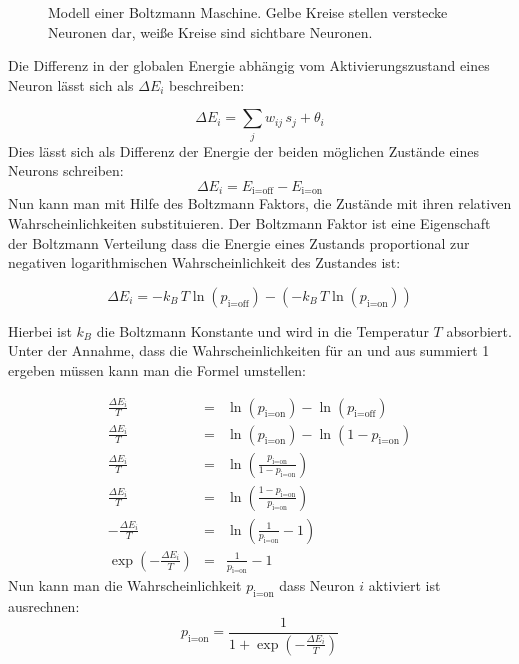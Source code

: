 \documentclass[12pt]{article}
\begin{document}
\begin{figure}[H]
	\center
	
	\caption{Modell einer Boltzmann Maschine. Gelbe Kreise stellen verstecke Neuronen dar, weiße Kreise sind sichtbare Neuronen.}
	\label{Boltzmannmaschine}
	\end{figure}
	
Die Differenz in der globalen Energie abhängig vom Aktivierungszustand eines Neuron lässt sich als  $\Delta E_i$ beschreiben:

\begin{equation}
\Delta E_i = \sum_j w_{ij} \, s_j + \theta_i
\end{equation}
 Dies lässt sich als Differenz der Energie der beiden möglichen Zustände eines Neurons schreiben:
 \begin{equation}
 \Delta E_i = E_\text{i=off} - E_\text{i=on}
 \end{equation}
 Nun kann man mit Hilfe des Boltzmann Faktors, die Zustände mit ihren relativen Wahrscheinlichkeiten substituieren. Der Boltzmann Faktor ist eine Eigenschaft der Boltzmann Verteilung dass die Energie eines Zustands proportional zur negativen logarithmischen Wahrscheinlichkeit des Zustandes ist:
 
 \begin{equation}
 \Delta E_i = -k_B\,T\ln(p_\text{i=off}) - (-k_B\,T\ln(p_\text{i=on}))
 \end{equation}
 
 Hierbei ist $k_B$ die Boltzmann Konstante und wird in die Temperatur $T$ absorbiert. Unter der Annahme, dass die Wahrscheinlichkeiten für an und aus summiert 1 ergeben müssen kann man die Formel umstellen:
 
 \begin{eqnarray}
 \frac{\Delta E_i}{T} &=& \ln(p_\text{i=on}) - \ln(p_\text{i=off})\\\nonumber
\frac{\Delta E_i}{T} &=& \ln(p_\text{i=on}) - \ln(1 - p_\text{i=on})\\\nonumber
\frac{\Delta E_i}{T} &=& \ln\left(\frac{p_\text{i=on}}{1 - p_\text{i=on}}\right)\\\nonumber
\frac{\Delta E_i}{T} &=& \ln\left(\frac{1 - p_\text{i=on}}{p_\text{i=on}}\right)\\\nonumber
-\frac{\Delta E_i}{T} &=& \ln\left(\frac{1}{p_\text{i=on}} - 1\right)\\\nonumber
\exp\left(-\frac{\Delta E_i}{T}\right) &=& \frac{1}{p_\text{i=on}} - 1
 \end{eqnarray}
Nun kann man die Wahrscheinlichkeit $p_\text{i=on}$ dass Neuron $i$ aktiviert ist ausrechnen:
\begin{equation}
p_\text{i=on} = \frac{1}{1+\exp(-\frac{\Delta E_i}{T})}
\end{equation}
\end{document}

